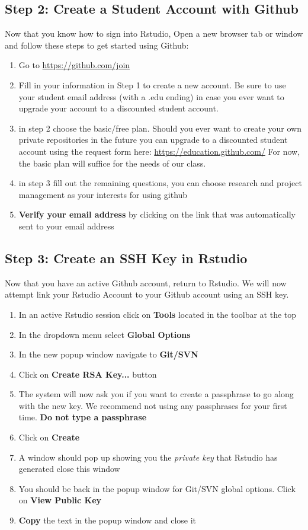 \documentclass{article}\usepackage[]{graphicx}\usepackage[]{color}
\begin{document}
  \subsection*{Step 2: Create a Student Account with Github}
 Now that you know how to sign into Rstudio, Open a new browser tab or window and follow these steps to get started using Github:
    \begin{enumerate}
    \item Go to \url{https://github.com/join}
    \item Fill in your information in Step 1 to create a new account. Be sure to use your student email address (with a .edu ending) in case you ever want to upgrade your account to a discounted student account. 
    \item in step 2 choose the basic/free plan. Should you ever want to create your own private repositories in the future you can upgrade to a discounted student account using the request form here: \url{https://education.github.com/} For now, the basic plan will suffice for the needs of our class. 
    \item in step 3 fill out the remaining questions, you can choose research and project management as your interests for using github
    
    \item \textbf{Verify your email address} by clicking on the link that was automatically sent to your email address
    \end{enumerate}
    
    
  \subsection*{Step 3: Create an SSH Key in Rstudio}
Now that you have an active Github account, return to Rstudio. We will now attempt link your Rstudio Account to your Github account using an SSH key. 
  \begin{enumerate}
  \item In an active Rstudio session click on \textbf{Tools} located in the toolbar at the top
  \item In the dropdown menu select \textbf{Global Options}
  \item In the new popup window navigate to \textbf{Git/SVN} 
  \item Click on \textbf{Create RSA Key...} button
  \item The system will now ask you if you want to create a passphrase to go along with the new key. We recommend not using any passphrases for your first time. \textbf{Do not type a passphrase}
  \item Click on \textbf{Create}
  \item A window should pop up showing you the \emph{private key} that Rstudio has generated close this window
  \item You should be back in the popup window for Git/SVN global options. Click on \textbf{View Public Key}
  \item \textbf{Copy} the text in the popup window and close it
  \end{enumerate}
  
\end{document}

